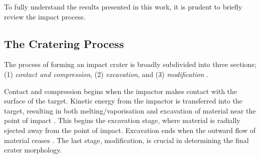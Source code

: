 To fully understand the results presented in this work, it is prudent to briefly review the impact process.

\subsection{The Cratering Process}

The process of forming an impact crater is broadly subdivided into three sections; (1) \textit{contact and compression}, (2) \textit{excavation}, and (3) \textit{modification} \citep{osinski2012impact}. 

Contact and compression begins when the impactor makes contact with the surface of the target. Kinetic energy from the impactor is transferred into the target, resulting in both melting/vaporisation and excavation of material near the point of impact \citep{melosh2012contact}. This begins the excavation stage, where material is radially ejected away from the point of impact. Excavation ends when the outward flow of material ceases \citetext{e.g., \citet{osinski2012impact}}. The last stage, modification, is crucial in determining the final crater morphology.

